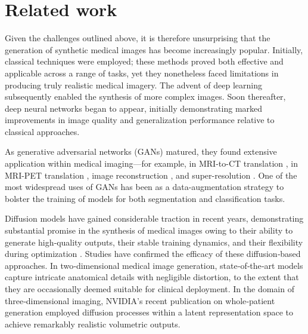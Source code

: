 \documentclass{article}
\begin{document}
\section{Related work}
Given the challenges outlined above, it is therefore unsurprising that the generation of synthetic medical images has become increasingly popular. Initially, classical techniques \citep{927467, aubert2006twenty, PRASTAWA2009297, segars20104d, jan2004gate} were employed; these methods proved both effective and applicable across a range of tasks, yet they nonetheless faced limitations in producing truly realistic medical imagery. The advent of deep learning subsequently enabled the synthesis of more complex images. Soon thereafter, deep neural networks began to appear, initially demonstrating marked improvements in image quality and generalization performance relative to classical approaches.

As generative adversarial networks (GANs) matured, they found extensive application within medical imaging—for example, in MRI-to-CT translation \citep{hu2021bidirectional}, in MRI-PET translation \citep{WEI2019101546, https://doi.org/10.1002/mrm.28819, Lin2021BidirectionalMO, sikka2021mri, ZHANG2022106676, s22124640, WANG2024102983}, image reconstruction \citep{peng2022towards, xie2022measurement}, and super-resolution \citep{pham2019multiscale, ensemblect}. One of the most widespread uses of GANs has been as a data-augmentation strategy to bolster the training of models for both segmentation and classification tasks. 

Diffusion models have gained considerable traction in recent years, demonstrating substantial promise in the synthesis of medical images owing to their ability to generate high‐quality outputs, their stable training dynamics, and their flexibility during optimization \citep{rombach2022high}. Studies \citep{durrer2023diffusion, graf2023denoising, pan2025cycle, zhu2023make, article_nature, kim2024adaptive, zhu2024generative, dorjsembe2024conditional, pan2024synthetic, li2024pasta} have confirmed the efficacy of these diffusion‐based approaches. In two‐dimensional medical image generation, state‐of‐the‐art models capture intricate anatomical details with negligible distortion, to the extent that they are occasionally deemed suitable for clinical deployment. In the domain of three‐dimensional imaging, NVIDIA’s recent publication \citep{guo2025maisi} on whole‐patient generation employed diffusion processes within a latent representation space to achieve remarkably realistic volumetric outputs.
\end{document}

